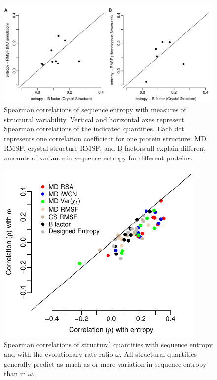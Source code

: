 \documentclass[smallextended]{svjour3}
\begin{document}
\begin{figure}[tbh]
\begin{center}
    \includegraphics[width=6.5in]{cor_entropy_bfca_rmsf.pdf}
\end{center}
\caption{Spearman correlations of sequence entropy with measures of structural variability.
Vertical and horizontal axes represent Spearman correlations of the indicated quantities. Each dot represents one correlation coefficient for one protein structure. MD RMSF, crystal-structure RMSF, and B factors all explain different amounts of variance in sequence entropy for different proteins.}
\label{fig:cor_entropy_bfca_rmsf}
\end{figure}

\begin{figure}[tbh]
\begin{center}
    \includegraphics[width=4in]{cor_entropy_omega.pdf}
\end{center}
\caption{Spearman correlations of structural quantities with sequence entropy and with the evolutionary rate ratio $\omega$. All structural quantities generally predict as much as or more variation in sequence entropy than in $\omega$.}
\label{fig:cor_entropy_omega}
\end{figure}
\end{document}
